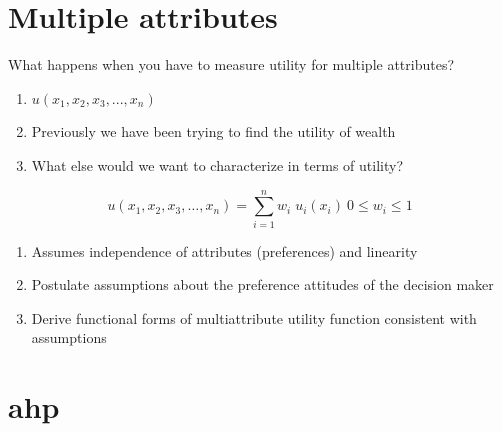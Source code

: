 \documentclass[aspectratio=1610,pdftex,dvipsnames,compress,xcolor={dvipsnames}]{beamer}
\newcommand{\acf}{\acrfull} %
\begin{document}
\section{Multiple attributes}


\addtocounter{framenumber}{-1}
\begin{frame}{What happens when you have to measure utility for multiple attributes?}
    \begin{enumerate}[series=outerlist,topsep=0pt,itemsep=7pt,leftmargin=*,label=(\arabic*)]
        \item[]$u(x_1,x_2,x_3,...,x_n)$
        \item[]Previously we have been trying to find the utility of wealth  
        \item[]What else would we want to characterize in terms of utility?
    \end{enumerate}

    \begin{equation}
        u(x_1,x_2,x_3, \ldots ,x_n) = \sum_{i=1}^n w_i \; u_i(x_i) \: 0 \leq w_i \leq 1
    \end{equation}

    \begin{enumerate}[series=outerlist,topsep=0pt,itemsep=11pt,leftmargin=*,label=(\arabic*)]
        \item[]Assumes independence of attributes (preferences) and linearity 
        \item[]Postulate assumptions about the preference attitudes of the decision maker
        \item[]Derive functional forms of multiattribute utility function consistent with assumptions
    \end{enumerate}
\end{frame}


\section{\acf{ahp}}
\end{document}
